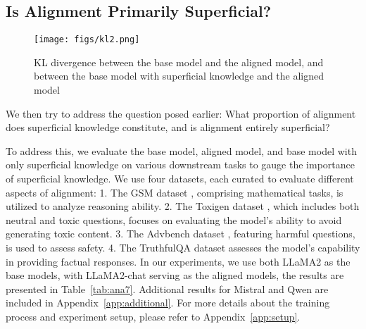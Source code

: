 \subsection{Is Alignment Primarily Superficial?}
\label{sec:align_comp}
\begin{figure}[h]
\centering
\vskip -0.4in
  \texttt{[image: figs/kl2.png]}
  \caption{KL divergence between the base model and the aligned model, and between the base model with superficial knowledge and the aligned model}
\label{fig:kl}
\end{figure}

We then try to address the question posed earlier: What proportion of alignment does superficial knowledge constitute, and is alignment entirely superficial?

To address this, 
we evaluate the base model, aligned model, and base model with only superficial knowledge on various downstream tasks to gauge the importance of superficial knowledge. We use four datasets, each curated to evaluate different aspects of alignment: 1. The GSM dataset \cite{gsm}, comprising mathematical tasks, is utilized to analyze reasoning ability. 2. The Toxigen dataset \cite{toxigen}, which includes both neutral and toxic questions, focuses on evaluating the model's ability to avoid generating toxic content. 3. The Advbench dataset \cite{advbench}, featuring harmful questions, is used to assess safety. 4. The TruthfulQA dataset \cite{truthfulqa} assesses the model’s capability in providing factual responses.   In our experiments, we use both LLaMA2 as the base models, with LLaMA2-chat serving as the aligned models, the results are presented in Table~\ref{tab:ana7}. Additional results for Mistral and Qwen are included in Appendix~\ref{app:additional}. For more details about the training process and experiment setup, please refer to Appendix~\ref{app:setup}. 


